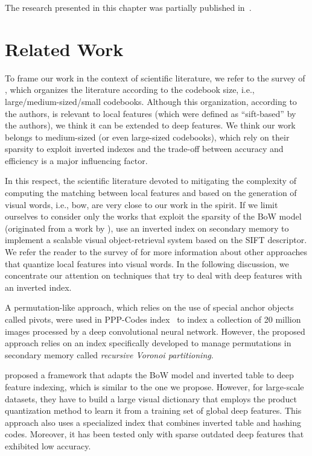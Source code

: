 The research presented in this chapter was partially published in~\cite{amato2017efficient,amato2018large}.

\section{Related Work}
\label{sec:str:related-work}
To frame our work in the context of scientific literature, we refer to the survey of \citet{zheng2018sift}, which organizes the literature according to the codebook size, i.e., large/medium-sized/small codebooks.
Although this organization, according to the authors, is relevant to local features (which were defined as ``sift-based'' by the authors), we think it can be extended to deep features.
We think our work belongs to medium-sized (or even large-sized codebooks), which rely on their sparsity to exploit inverted indexes and the trade-off between accuracy and efficiency is a major influencing factor.

In this respect, the scientific literature devoted to mitigating the complexity of computing the matching between local features and based on the generation of visual words, i.e., \acrfull{bow}, are very close to our work in the spirit.
If we limit ourselves to consider only the works that exploit the sparsity of the BoW model (originated from a work by \citet{sivic2003video}), \citet{philbin2007object} use an inverted index on secondary memory to implement a scalable visual object-retrieval system based on the SIFT descriptor.
We refer the reader to the survey of \citet{zheng2018sift} for more information about other approaches that quantize local features into visual words.
In the following discussion, we concentrate our attention on techniques that try to deal with deep features with an inverted index.

A permutation-like approach, which relies on the use of special anchor objects called pivots, were used in PPP-Codes index~\cite{novak2015large} to index a collection of 20 million images processed by a deep convolutional neural network.
However, the proposed approach relies on an index specifically developed to manage permutations in secondary memory called \emph{recursive Voronoi partitioning}.

\citet{liu2015indexing} proposed a framework that adapts the BoW model and inverted table to deep feature indexing, which is similar to the one we propose.
However, for large-scale datasets, they have to build a large visual dictionary that employs the product quantization method to learn it from a training set of global deep features.
This approach also uses a specialized index that combines inverted table and hashing codes.
Moreover, it has been tested only with sparse outdated deep features that exhibited low accuracy.

